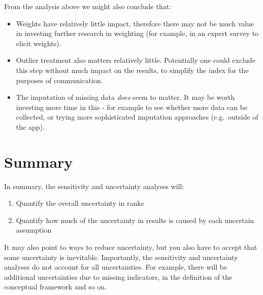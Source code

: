 \documentclass[
  letterpaper,
  DIV=11,
  numbers=noendperiod]{scrreprt}
\providecommand{\tightlist}{%
  \setlength{\itemsep}{0pt}\setlength{\parskip}{0pt}}\usepackage{longtable,booktabs,array}
\begin{document}
From the analysis above we might also conclude that:

\begin{itemize}
\tightlist
\item
  Weights have relatively little impact, therefore there may not be much
  value in investing further research in weighting (for example, in an
  expert survey to elicit weights).
\item
  Outlier treatment also matters relatively little. Potentially one
  could exclude this step without much impact on the results, to
  simplify the index for the purposes of communication.
\item
  The imputation of missing data \emph{does} seem to matter. It may be
  worth investing more time in this - for example to see whether more
  data can be collected, or trying more sophisticated imputation
  approaches (e.g.~outside of the app).
\end{itemize}

\hypertarget{summary}{%
\section{Summary}\label{summary}}

In summary, the sensitivity and uncertainty analyses will:

\begin{enumerate}
\def\labelenumi{(\alph{enumi})}
\tightlist
\item
  Quantify the overall uncertainty in ranks
\item
  Quantify how much of the uncertainty in results is caused by each
  uncertain assumption
\end{enumerate}

It may also point to ways to reduce uncertainty, but you also have to
accept that some uncertainty is inevitable. Importantly, the sensitivity
and uncertainty analyses do not account for all uncertainties. For
example, there will be additional uncertainties due to missing
indicators, in the definition of the conceptual framework and so on.
\end{document}
